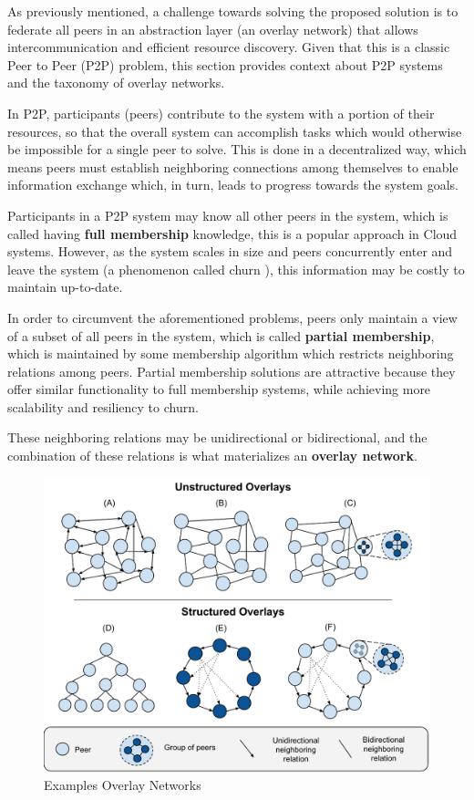 

As previously mentioned, a challenge towards solving the proposed solution is to federate all peers in an abstraction layer (an overlay network) that allows intercommunication and efficient resource discovery. Given that this is a classic Peer to Peer (P2P) problem, this section provides context about P2P systems and the taxonomy of overlay networks.

In P2P, participants (peers) contribute to the system with a portion of their resources, so that the overall system can accomplish tasks which would otherwise be impossible for a single peer to solve. This is done in a decentralized way, which means peers must establish neighboring connections among themselves to enable information exchange which, in turn, leads to progress towards the system goals. 

Participants in a P2P system may know all other peers in the system, which is called having \textbf{full membership} knowledge, this is a popular approach in Cloud systems. However, as the system scales in size and peers concurrently enter and leave the system (a phenomenon called churn \cite{stutzbach2006understanding}), this information may be costly to maintain up-to-date. 

In order to circumvent the aforementioned problems, peers only maintain a view of a subset of all peers in the system, which is called \textbf{partial membership}, which is maintained by some membership algorithm which restricts neighboring relations among peers. Partial membership solutions are attractive because they offer similar functionality to full membership systems, while achieving more scalability and resiliency to churn. 

These neighboring relations may be unidirectional or bidirectional, and the combination of these relations is what materializes an \textbf{overlay network}.

\begin{figure}[h]
    \centering
    \includegraphics[width=\linewidth]{Figures/overlay_networks.pdf}
    \caption{Examples Overlay Networks}
    \label{fig:overlay_networks}
\end{figure}


